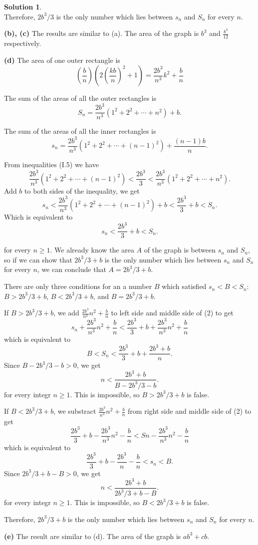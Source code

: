 \documentclass[11pt,a4paper]{book}
\theoremstyle{definition}
\newtheorem{solution}{Solution}
\begin{document}
\begin{solution}{\ \\}
  Therefore, $2b^3/3$ is the only number which lies between $s_n$ and $S_n$ for every $n$.

  \vspace{2\baselineskip}
  \textbf{(b), (c)} The results are similar to (a). The area of the graph is $b^3$ and $\frac{b^3}{12}$ respectively.

  \vspace{2\baselineskip}
  \textbf{(d)} The area of one outer rectangle is
  \[
  \left( \frac{b}{n} \right) \left( 2 \left( \frac{kb}{n} \right)^2 + 1 \right) = \frac{2b^3}{n^3}k^2 + \frac{b}{n}
  \]

  The sum of the areas of all the outer rectangles is
  \[
    S_n = \frac{2b^3}{n^3} \left( 1^2 + 2^2 + \cdots + n^2 \right) + b.
  \]

  The sum of the areas of all the inner rectangles is
  \[
    s_n = \frac{2b^3}{n^3} \left( 1^2 + 2^2 + \cdots + (n-1)^2 \right) + \frac{(n-1)b}{n}.
  \]

  From inequalities (I.5) we have
  \[
  \frac{2b^3}{n^3} \left(1^2 + 2^2 + \cdots + (n-1)^2 \right) < \frac{2b^3}{3} < \frac{2b^3}{n^3} \left( 1^2 + 2^2 + \cdots + n^2 \right).
  \]
  Add $b$ to both sides of the inequality, we get
  \[
  s_n < \frac{2b^3}{n^3}\left( 1^2 + 2^2 + \cdots + (n-1)^2 \right) + b < \frac{2b^3}{3} + b < S_n.
  \]
  Which is equivalent to
  \[
  s_n < \frac{2b^3}{3} + b < S_n. \tag{2}
  \]

  for every $n \ge 1$. We already know the area $A$ of the graph is between $s_n$ and $S_n$, so if we can 
  show that $2b^3/3 + b$ is the only number which lies between $s_n$ and $S_n$ for every $n$, we can conclude that $A = 2b^3/3 + b$.

  There are only three conditions for an a number $B$ which satisfied $s_n < B < S_n$: $B > 2b^3/3 + b$, $B < 2b^3/3 + b$, and $B = 2b^3/3 + b$.

  If $B > 2b^3/3 + b$, we add $\frac{2b^3}{n^3}n^2 + \frac{b}{n}$ to left side and middle side of (2) to get
  \[
  s_n + \frac{2b^3}{n^3}n^2 + \frac{b}{n} < \frac{2b^3}{3} + b + \frac{2b^3}{n^3}n^2 + \frac{b}{n}
  \]
  which is equivalent to
  \[
  B < S_n < \frac{2b^3}{3} + b + \frac{2b^3 + b}{n}.
  \]
  Since $B - 2b^3/3 - b > 0$, we get
  \[
  n < \frac{2b^3 + b}{B - 2b^3/3 - b}.
  \]
  for every integr $n \ge 1$. This is impossible, so $B > 2b^3/3 + b$ is false.

  If $B < 2b^3/3 + b$, we substract $\frac{2b^3}{n^3}n^2 + \frac{b}{n}$ from right side and middle side of (2) to get
  \[
  \frac{2b^3}{3} + b - \frac{2b^3}{n^3}n^2 - \frac{b}{n} < Sn - \frac{2b^3}{n^3}n^2 - \frac{b}{n}
  \]
  which is equivalent to
  \[
  \frac{2b^3}{3} + b - \frac{2b^3}{n} - \frac{b}{n} < s_n < B.
  \]
  Since $2b^3/3 + b - B > 0$, we get
  \[
  n < \frac{2b^3 + b}{2b^3/3 + b - B}.
  \]
  for every integr $n \ge 1$. This is impossible, so $B < 2b^3/3 + b$ is false.

  Therefore, $2b^3/3 + b$ is the only number which lies between $s_n$ and $S_n$ for every $n$.

  \vspace{2\baselineskip}
  \textbf{(e)} The result are similar to (d). The area of the graph is $ab^3 + cb$.
\end{solution}
\vrule
\end{document}
